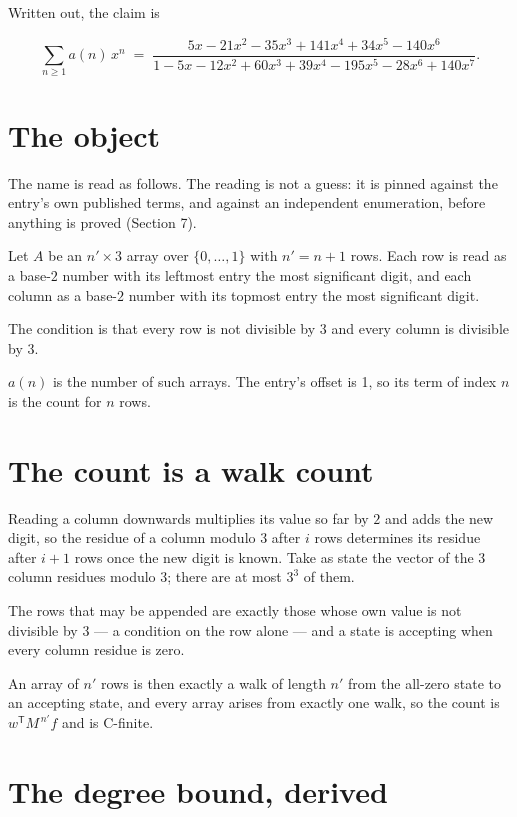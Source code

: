 \documentclass[11pt]{article}
\theoremstyle{definition}
\begin{document}
Written out, the claim is

\[\sum_{n \ge 1} a(n)\,x^n \;=\; \frac{5x - 21x^{2} - 35x^{3} + 141x^{4} + 34x^{5} - 140x^{6}}{1 - 5x - 12x^{2} + 60x^{3} + 39x^{4} - 195x^{5} - 28x^{6} + 140x^{7}}.\]

\section{The object}

The name is read as follows. The reading is not a guess: it is pinned against the entry's own published terms, and against an independent enumeration, before anything is proved (Section 7).

Let $A$ be an $n' \times 3$ array over $\{0,\dots,1\}$ with $n' = n + 1$ rows. Each row is read as a base-$2$ number with its leftmost entry the most significant digit, and each column as a base-$2$ number with its topmost entry the most significant digit.

The condition is that every row is not divisible by $3$ and every column is divisible by $3$.

$a(n)$ is the number of such arrays. The entry's offset is 1, so its term of index $n$ is the count for $n$ rows.

\section{The count is a walk count}

Reading a column downwards multiplies its value so far by $2$ and adds the new digit, so the residue of a column modulo $3$ after $i$ rows determines its residue after $i+1$ rows once the new digit is known. Take as state the vector of the $3$ column residues modulo $3$; there are at most $3^{3}$ of them.

The rows that may be appended are exactly those whose own value is not divisible by $3$ --- a condition on the row alone --- and a state is accepting when every column residue is zero.

An array of $n'$ rows is then exactly a walk of length $n'$ from the all-zero state to an accepting state, and every array arises from exactly one walk, so the count is $w^{\mathsf T}M^{\,n'}f$ and is C-finite.

\section{The degree bound, derived}
\end{document}
